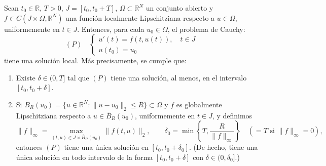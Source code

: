 \begin{teorema}
    Sean $t_0 \in \mathbb{R}$, $T > 0$, $J = [t_0, t_0 + T]$, $\Omega \subset \mathbb{R}^N$ un conjunto abierto y $f \in C(J \times \Omega, \mathbb{R}^N)$ una función localmente Lipschitziana respecto a $u \in \Omega$, uniformemente en $t \in J$. Entonces, para cada $u_0 \in \Omega$, el problema de Cauchy:
    \[
        (P) \quad
        \begin{cases}
            u'(t) = f(t, u(t)), \quad t \in J \\
            u(t_0) = u_0
        \end{cases}
    \]
    tiene una solución local. Más precisamente, se cumple que:
    \begin{enumerate}[label=\alph*)]
        \item Existe $\delta \in (0, T]$ tal que $(P)$ tiene una solución, al menos, en el intervalo $[t_0, t_0 + \delta]$.
        \item Si $\overline{B}_R(u_0) = \{u \in \mathbb{R}^N : \| u - u_0 \|_2 \leq R\} \subset \Omega$ y $f$ es globalmente Lipschitziana respecto a $u \in \overline{B}_R(u_0)$, uniformemente en $t \in J$, y definimos
        \[
            \| f \|_\infty = \max_{(t,u) \in J \times \overline{B}_R(u_0)} \| f(t,u) \|_2, \qquad
            \delta_0 = \min \left\{ T, \frac{R}{\| f \|_\infty} \right\} \quad (= T \text{ si } \| f \|_\infty = 0),
        \]
        entonces $(P)$ tiene una única solución en $[t_0, t_0 + \delta_0]$. (De hecho, tiene una única solución en todo intervalo de la forma $[t_0, t_0 + \delta]$ con $\delta \in (0, \delta_0]$.)
    \end{enumerate}
\end{teorema}

